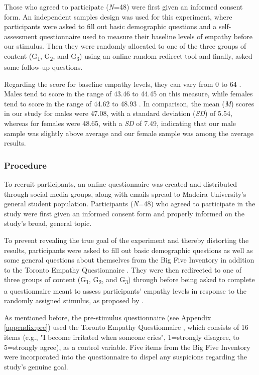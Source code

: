 Those who agreed to participate (\textit{N}=48) were first given an informed consent form. An independent samples design was used for this experiment, where participants were asked to fill out basic demographic questions and a self-assessment questionnaire \cite{SPR03} used to measure their baseline levels of empathy before our stimulus. Then they were randomly allocated to one of the three groups of content (G\textsubscript{1}, G\textsubscript{2}, and G\textsubscript{3}) using an online random redirect tool \cite{FER19} and finally, asked some follow-up questions.

Regarding the score for baseline empathy levels, they can vary from 0 to 64 \cite{SPR09}. Males tend to score in the range of 43.46 to 44.45 on this measure, while females tend to score in the range of 44.62 to 48.93 \cite{SPR09}. In comparison, the mean (\textit{M}) scores in our study for males were 47.08, with a standard deviation (\textit{SD}) of 5.54, whereas for females were 48.65, with a \textit{SD} of 7.49, indicating that our male sample was slightly above average and our female sample was among the average results.

\subsubsection{Procedure}
To recruit participants, an online questionnaire was created and distributed through social media groups, along with emails spread to Madeira University's general student population. Participants (\textit{N}=48) who agreed to participate in the study were first given an informed consent form and properly informed on the study's broad, general topic. 

To prevent revealing the true goal of the experiment and thereby distorting the results, participants were asked to fill out basic demographic questions as well as some general questions about themselves from the Big Five Inventory \cite{JOH91} in addition to the Toronto Empathy Questionnaire \cite{SPR03}. They were then redirected to one of three groups of content (G\textsubscript{1}, G\textsubscript{2}, and G\textsubscript{3}) through \cite{FER19} before being asked to complete a questionnaire meant to assess participants' empathy levels in response to the randomly assigned stimulus, as proposed by  \cite{ROT19, ZIB19}.

As mentioned before, the pre-stimulus questionnaire (see Appendix \ref{appendix:pre}) used the Toronto Empathy Questionnaire \cite{SPR03}, which consists of 16 items (e.g., "I become irritated when someone cries", 1=strongly disagree, to 5=strongly agree), as a control variable. Five items from the Big Five Inventory \cite{JOH91} were incorporated into the questionnaire to dispel any suspicions regarding the study's genuine goal.

